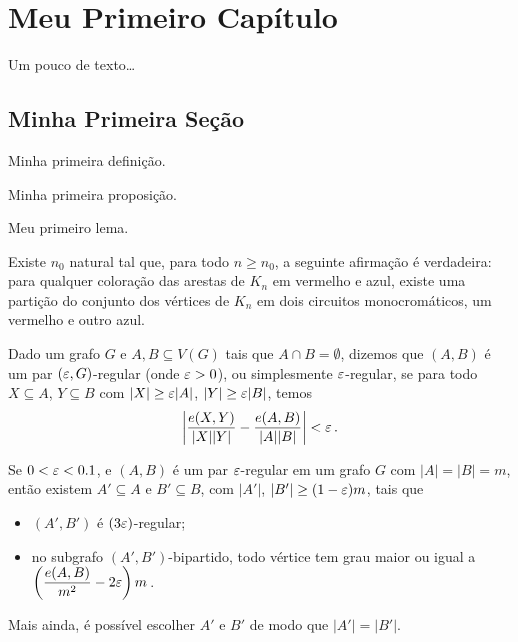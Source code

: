 \chapter{Meu Primeiro Capítulo}

Um pouco de texto\ldots

\section{Minha Primeira Seção}

\begin{defi}
  Minha primeira definição. 
\end{defi}

\begin{prop}
  Minha primeira proposição.
\end{prop}

\begin{prop}
  Meu primeiro lema.
\end{prop}

\begin{teo}
  \label{teo_principal}
  Existe $n_0$ natural tal que, para todo $n\geq n_0$, a seguinte afirmação é verdadeira: para qualquer coloração das arestas de $K_n$ em vermelho e azul, existe uma partição do conjunto dos vértices de $K_n$ em dois circuitos monocromáticos, um vermelho e outro azul.
\end{teo}

\begin{defi}
	Dado um grafo $G$ e $A, B \subseteq V(G)$ tais que $A\cap B = \emptyset$, dizemos que $(A,B)$ é um par $(\varepsilon,G)$-regular (onde $\varepsilon>0$), ou simplesmente $\varepsilon$-regular, se para todo $X\subseteq A$, $Y\subseteq B$ com $\lvert X\rvert\geq\varepsilon\lvert A\rvert$, $\lvert Y\rvert\geq\varepsilon\lvert B\rvert$, temos
	\[
	\left\lvert \frac{e(X,Y)}{\lvert X\rvert\lvert Y\rvert} - \frac{e(A,B)}{\lvert A\rvert\lvert B\rvert}\right\rvert < \varepsilon\,.
	\]
\end{defi}

\begin{prop}
	Se $0<\varepsilon<0.1$, e $(A,B)$ é um par $\varepsilon$-regular em um grafo $G$ com $|A| = |B| = m$, então existem $A'\subseteq A$ e $B'\subseteq B$, com $\lvert A'\rvert$, $\lvert B'\rvert\geq(1-\varepsilon)m$, tais que
	\begin{itemize}
		\item $(A', B')$ é $(3\varepsilon)$-regular;
		\item no subgrafo $(A', B')$-bipartido, todo vértice tem grau maior ou igual a $\left(\dfrac{e(A,B)}{m^2} -2\varepsilon\right)m$\,.
	\end{itemize}
	Mais ainda, é possível escolher $A'$ e $B'$ de modo que $|A'| = |B'|$.
\end{prop}

